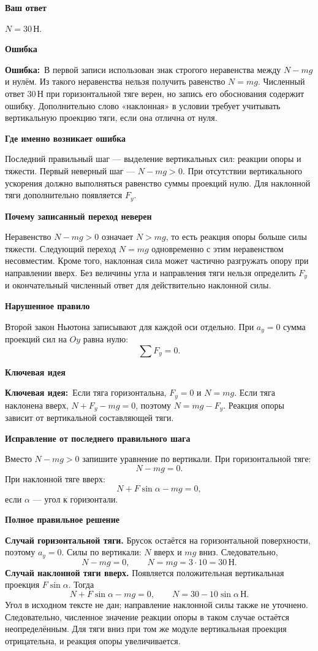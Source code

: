 \documentclass[a4paper,12pt]{article}
\newcommand{\subblock}[1]{\par\medskip\textbf{\color{deepaccent}#1}\par\vspace{-2pt}}
\newcommand{\errorlabel}{\textcolor{errorred}{\textbf{Ошибка:}}}
\newcommand{\keyidea}{\textcolor{ideablue}{\textbf{Ключевая идея:}}}
\begin{document}
\subblock{Ваш ответ}
$N=30\,\text{Н}$.

\subblock{Ошибка}
\errorlabel\ В первой записи использован знак строгого неравенства между $N-mg$ и нулём. Из такого неравенства нельзя получить равенство $N=mg$. Численный ответ $30\,\text{Н}$ при горизонтальной тяге верен, но запись его обоснования содержит ошибку. Дополнительно слово «наклонная» в условии требует учитывать вертикальную проекцию тяги, если она отлична от нуля.

\subblock{Где именно возникает ошибка}
Последний правильный шаг --- выделение вертикальных сил: реакции опоры и тяжести. Первый неверный шаг --- $N-mg>0$. При отсутствии вертикального ускорения должно выполняться равенство суммы проекций нулю. Для наклонной тяги дополнительно появляется $F_y$.

\subblock{Почему записанный переход неверен}
Неравенство $N-mg>0$ означает $N>mg$, то есть реакция опоры больше силы тяжести. Следующий переход $N=mg$ одновременно с этим неравенством несовместим. Кроме того, наклонная сила может частично разгружать опору при направлении вверх. Без величины угла и направления тяги нельзя определить $F_y$ и окончательный численный ответ для действительно наклонной силы.

\subblock{Нарушенное правило}
Второй закон Ньютона записывают для каждой оси отдельно. При $a_y=0$ сумма проекций сил на $Oy$ равна нулю:
\[\sum F_y=0.\]

\subblock{Ключевая идея}
\keyidea\ Если тяга горизонтальна, $F_y=0$ и $N=mg$. Если тяга наклонена вверх, $N+F_y-mg=0$, поэтому $N=mg-F_y$. Реакция опоры зависит от вертикальной составляющей тяги.

\subblock{Исправление от последнего правильного шага}
Вместо $N-mg>0$ запишите уравнение по вертикали. При горизонтальной тяге:
\[N-mg=0.\]
При наклонной тяге вверх:
\[N+F\sin\alpha-mg=0,\]
если $\alpha$ --- угол к горизонтали.

\subblock{Полное правильное решение}
\textbf{Случай горизонтальной тяги.} Брусок остаётся на горизонтальной поверхности, поэтому $a_y=0$. Силы по вертикали: $N$ вверх и $mg$ вниз. Следовательно,
\[
N-mg=0,\qquad N=mg=3\cdot10=\boxed{30\,\text{Н}}.
\]
\textbf{Случай наклонной тяги вверх.} Появляется положительная вертикальная проекция $F\sin\alpha$. Тогда
\[
N+F\sin\alpha-mg=0,\qquad
\boxed{N=30-10\sin\alpha\,\text{Н}}.
\]
Угол в исходном тексте не дан; направление наклонной силы также не уточнено. Следовательно, численное значение реакции опоры в таком случае остаётся неопределённым. Для тяги вниз при том же модуле вертикальная проекция отрицательна, и реакция опоры увеличивается.
\end{document}
